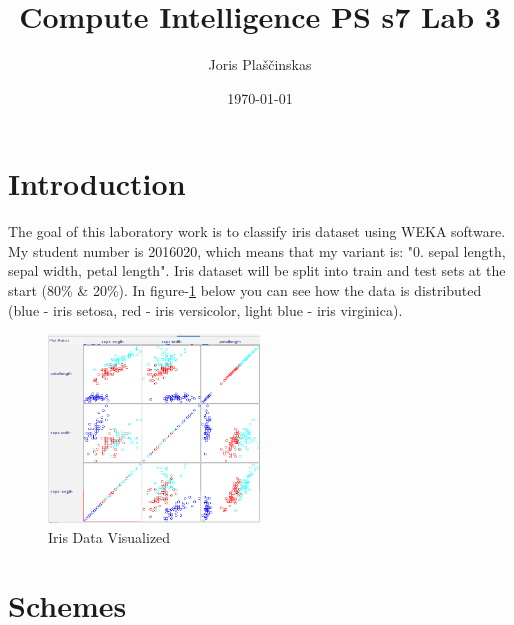 \documentclass{article}
\title{Compute Intelligence PS s7 Lab 3 }
\author{Joris Plaščinskas}
\date{\today}
\begin{document}
\maketitle
\section*{Introduction}
The goal of this laboratory work is to classify iris dataset using WEKA software. My student number is 2016020, which means that my variant is: "0. sepal length, sepal width, petal length". Iris dataset will be split into train and test sets at the start (80\% \& 20\%). In figure-\ref{fig:visualize} below you can see how the data is distributed (blue - iris setosa, red - iris versicolor, light blue - iris virginica).
\begin{figure}[H]
    \centering
    \includegraphics[width=0.5\textwidth]{visualize.png}
    \caption{Iris Data Visualized}
    \label{fig:visualize}
\end{figure}


\section*{Schemes}
\end{document}
